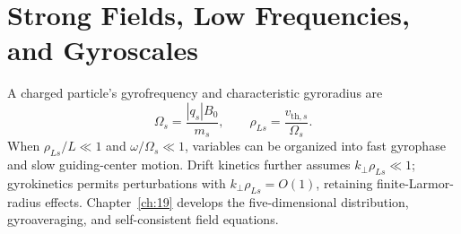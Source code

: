 \section{Strong Fields, Low Frequencies, and Gyroscales}
A charged particle's gyrofrequency and characteristic gyroradius are
\[
\Omega_s=\frac{|q_s|B_0}{m_s},\qquad
\rho_{Ls}=\frac{v_{\mathrm{th},s}}{\Omega_s}.
\]
When $\rho_{Ls}/L\ll1$ and $\omega/\Omega_s\ll1$, variables can be organized into fast gyrophase and slow guiding-center motion.
Drift kinetics further assumes $k_\perp\rho_{Ls}\ll1$; gyrokinetics permits perturbations with $k_\perp\rho_{Ls}=O(1)$,
retaining finite-Larmor-radius effects. Chapter~\ref{ch:19} develops the five-dimensional distribution, gyroaveraging, and self-consistent field equations.
